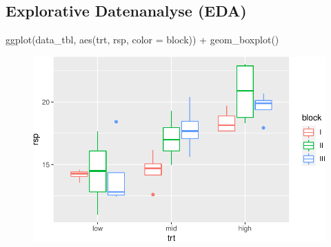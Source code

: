 \documentclass[
  letterpaper,
  DIV=11,
  oneside]{scrreport}
\newenvironment{Shaded}{\begin{snugshade}}{\end{snugshade}}
\newcommand{\AttributeTok}[1]{\textcolor[rgb]{0.40,0.45,0.13}{#1}}
\newcommand{\FunctionTok}[1]{\textcolor[rgb]{0.28,0.35,0.67}{#1}}
\newcommand{\NormalTok}[1]{\textcolor[rgb]{0.00,0.23,0.31}{#1}}
\newcommand{\SpecialCharTok}[1]{\textcolor[rgb]{0.37,0.37,0.37}{#1}}
\begin{document}
\hypertarget{explorative-datenanalyse-eda}{%
\subsection{Explorative Datenanalyse
(EDA)}\label{explorative-datenanalyse-eda}}

\begin{Shaded}
\begin{Highlighting}[]
\FunctionTok{ggplot}\NormalTok{(data\_tbl, }\FunctionTok{aes}\NormalTok{(trt, rsp, }\AttributeTok{color =}\NormalTok{ block)) }\SpecialCharTok{+}
  \FunctionTok{geom\_boxplot}\NormalTok{()}
\end{Highlighting}
\end{Shaded}

\begin{figure}[H]

{\centering \includegraphics{./app-example-analysis_files/figure-pdf/unnamed-chunk-5-1.pdf}

}

\end{figure}
\end{document}
